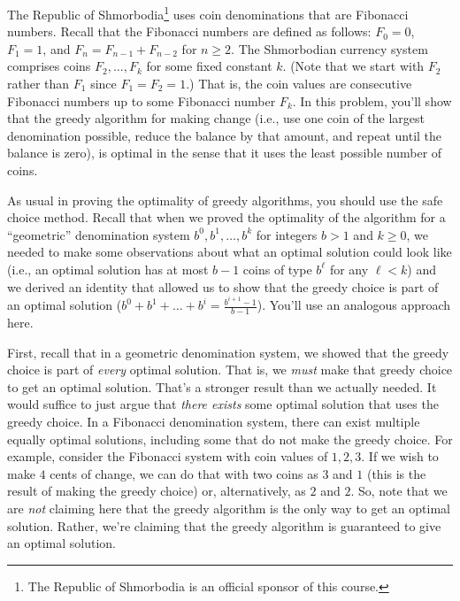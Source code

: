 \documentclass{ks-pset}
\begin{document}
\begin{problem}%
  The Republic of Shmorbodia\footnote{The Republic of Shmorbodia is an official
  sponsor of this course.} uses coin denominations that are Fibonacci numbers.
  Recall that the Fibonacci numbers are defined as follows:  $F_0 = 0$, $F_1 =
  1$, and $F_n = F_{n-1} + F_{n-2}$ for $n ≥ 2$.  The Shmorbodian currency
  system comprises coins $F_2, \dotsc, F_k$ for some fixed constant $k$.  (Note
  that we start with $F_2$ rather than $F_1$ since $F_1 = F_2 = 1$.)  That is,
  the coin values are consecutive Fibonacci numbers up to some Fibonacci number
  $F_k$.  In this problem, you'll show that the greedy algorithm for making
  change (i.e., use one coin of the largest denomination possible, reduce the
  balance by that amount, and repeat until the balance is zero), is optimal in
  the sense that it uses the least possible number of coins.

  As usual in proving the optimality of greedy algorithms, you should use the
  safe choice method.  Recall that when we proved the optimality of the
  algorithm for a ``geometric'' denomination system $b^0, b^1, \dots, b^k$ for
  integers $b > 1$ and $k ≥ 0$, we needed to make some observations about what
  an optimal solution could look like (i.e., an optimal solution has at most
  $b-1$ coins of type $b^{\ell}$ for any $\ell < k$) and we derived an identity
  that allowed us to show that the greedy choice is part of an optimal solution
  ($b^0 + b^1 + \dots + b^i = \frac{b^{i+1}-1}{b-1}$).  You'll use an analogous
  approach here.

  First, recall that in a geometric denomination system, we showed that the
  greedy choice is part of \emph{every} optimal solution.  That is, we
  \emph{must} make that greedy choice to get an optimal solution.  That's a
  stronger result than we actually needed.  It would suffice to just argue that
  \emph{there exists} some optimal solution that uses the greedy choice.  In a
  Fibonacci denomination system, there can exist multiple equally optimal
  solutions, including some that do not make the greedy choice.  For example,
  consider the Fibonacci system with coin values of $1, 2, 3$.  If we wish to
  make $4$ cents of change, we can do that with two coins as $3$ and $1$ (this
  is the result of making the greedy choice) or, alternatively, as $2$ and $2$.
  So, note that we are \emph{not} claiming here that the greedy algorithm is
  the only way to get an optimal solution.  Rather, we're claiming that the
  greedy algorithm is guaranteed to give an optimal solution.


\end{problem}
\end{document}
